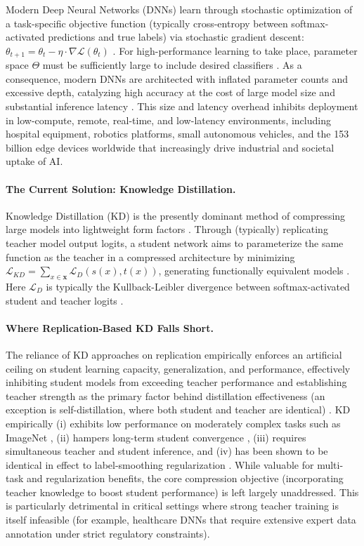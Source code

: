 \documentclass[letterpaper]{article}
\begin{document}
Modern Deep Neural Networks (DNNs) learn through stochastic optimization of a task-specific objective function (typically cross-entropy between softmax-activated predictions and true labels) via stochastic gradient descent: $\theta_{t+1} = \theta_t - \eta \cdot \nabla \mathcal{L}(\theta_t)$ \citep{domingos2012useful}. For high-performance learning to take place, parameter space $\Theta$ must be sufficiently large to include desired classifiers \citep{domingos2012useful}. As a consequence, modern DNNs are architected with inflated parameter counts and excessive depth, catalyzing high accuracy at the cost of large model size and substantial inference latency \citep{alkhulaifi2021kd}. This size and latency overhead inhibits deployment in low-compute, remote, real-time, and low-latency environments, including hospital equipment, robotics platforms, small autonomous vehicles, and the 153 billion edge devices worldwide that increasingly drive industrial and societal uptake of AI.

\paragraph{The Current Solution: Knowledge Distillation.}
Knowledge Distillation (KD) is the presently dominant method of compressing large models into lightweight form factors \citep{hinton2015distilling, gou2021kd, alkhulaifi2021kd}. Through (typically) replicating teacher model output logits, a student network aims to parameterize the same function as the teacher in a compressed architecture by minimizing $\mathcal{L}_{KD} = \sum_{x \in \mathbf{x}} \mathcal{L}_D(s(x), t(x))$, generating functionally equivalent models \citep{hinton2015distilling}. Here $\mathcal{L}_D$ is typically the Kullback-Leibler divergence between softmax-activated student and teacher logits \citep{hinton2015distilling, gou2021kd}.

\paragraph{Where Replication-Based KD Falls Short.}
The reliance of KD approaches on replication empirically enforces an artificial ceiling on student learning capacity, generalization, and performance, effectively inhibiting student models from exceeding teacher performance and establishing teacher strength as the primary factor behind distillation effectiveness (an exception is self-distillation, where both student and teacher are identical) \citep{cho2019efficacy, stanton2021does}. KD empirically (i) exhibits low performance on moderately complex tasks such as ImageNet \citep{cho2019efficacy}, (ii) hampers long-term student convergence \citep{stanton2021does}, (iii) requires simultaneous teacher and student inference, and (iv) has been shown to be identical in effect to label-smoothing regularization \citep{yuan2020revisiting}. While valuable for multi-task and regularization benefits, the core compression objective (incorporating teacher knowledge to boost student performance) is left largely unaddressed. This is particularly detrimental in critical settings where strong teacher training is itself infeasible (for example, healthcare DNNs that require extensive expert data annotation under strict regulatory constraints).
\end{document}
